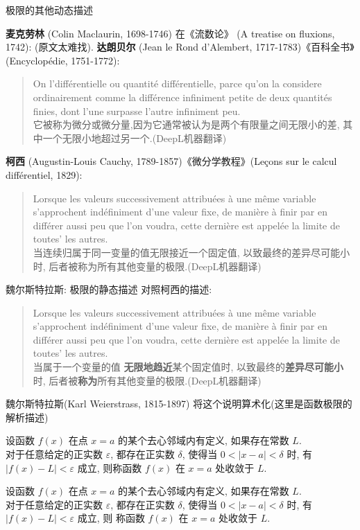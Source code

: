 \documentclass[
10pt,
aspectratio=43,
]{beamer}
\begin{document}
\begin{frame}{极限的其他动态描述}

    {\bf 麦克劳林} (Colin Maclaurin, 1698-1746) 在《流数论》 (A treatise on fluxions, 1742): (原文太难找).
    \pause
    {\bf 达朗贝尔} (Jean le Rond d'Alembert, 1717-1783)《百科全书》(Encyclopédie, 1751-1772):
    \begin{quote}
        On l'différentielle ou quantité différentielle, parce qu'on la considere ordinairement comme la différence infiniment petite de deux quantités finies, dont l'une surpasse l'autre infiniment peu.\\
        它被称为微分或微分量,因为它通常被认为是两个有限量之间无限小的差, 其中一个无限小地超过另一个.(DeepL机器翻译)
    \end{quote}
    \pause
    {\bf 柯西} (Augustin-Louis Cauchy, 1789-1857)《微分学教程》(Leçons sur le calcul différentiel, 1829):
    \begin{quote}
        Lorsque les valeurs successivement attribuées à une même variable s'approchent indéfiniment d'une valeur fixe, de manière à finir par en différer aussi peu que l'on voudra, cette dernière est appelée la limite de toutes' les autres.\\
        当连续归属于同一变量的值无限接近一个固定值, 以致最终的差异尽可能小时, 后者被称为所有其他变量的极限.(DeepL机器翻译)
    \end{quote}
\end{frame}

\begin{frame}{魏尔斯特拉斯: 极限的静态描述}
    对照柯西的描述:
    \begin{quote}
        Lorsque les valeurs successivement attribuées à une même variable s'approchent indéfiniment d'une valeur fixe, de manière à finir par en différer aussi peu que l'on voudra, cette dernière est appelée la limite de toutes' les autres.\\
        当属于一个变量的值{\bf \color{red} 无限地趋近}某个固定值时, 以致最终的{\bf\color{blue}差异尽可能小}时, 后者被{\bf \color{green}称为}所有其他变量的极限.(DeepL机器翻译)
    \end{quote}
    \pause
    魏尔斯特拉斯(Karl Weierstrass, 1815-1897) 将这个说明算术化{\small (这里是函数极限的解析描述)}
    \begin{block}{}
        设函数 $f(x)$ 在点 $x=a$ 的某个去心邻域内有定义, 如果存在常数 $L$.\\
        对于任意给定的正实数 $\varepsilon$, 都存在正实数 $\delta$, 使得当 $0 < |x-a| < \delta$ 时, 有 $|f(x) - L| < \varepsilon$ 成立, 则称函数 $f(x)$ 在 $x=a$ 处收敛于 $L$.
    \end{block}
    \pause
    \begin{block}{}
        设函数 $f(x)$ 在点 {\color{red}$x=a$} 的某个去心邻域内有定义, 如果存在{\color{green}常数 $L$}.\\
        {\color{blue}对于任意给定的正实数 $\varepsilon$}, 都存在{\color{red}正实数 $\delta$, 使得当 $0 < |x-a| < \delta$ 时}, {\color{blue}有 $|f(x) - L| < \varepsilon$ 成立}, 则{\color{green} 称函数 $f(x)$ 在 $x=a$ 处收敛于 $L$}.
    \end{block}
\end{frame}
\end{document}
